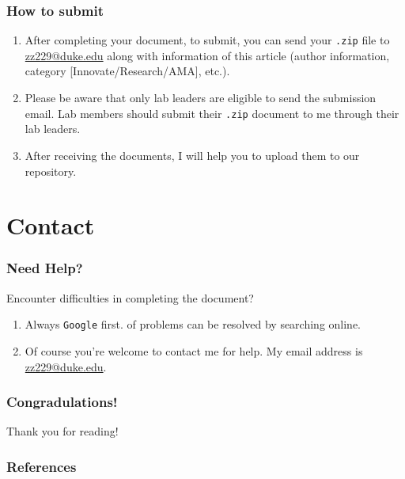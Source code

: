 \documentclass{beamer}
\begin{document}
\begin{frame}
    \frametitle{How to submit}

    \begin{enumerate}
        \item  After completing your document, to submit, you can send your \texttt{.zip} file to \href{mailto:zz229@duke.edu}{zz229@duke.edu} along with information of this article (author information, category [Innovate/Research/AMA], etc.).
        \item Please be aware that only lab leaders are eligible to send the submission email. Lab members should submit their \texttt{.zip} document to me through their lab leaders.
        \item After receiving the documents, I will help you to upload them to our repository.
    \end{enumerate}
\end{frame}

\section{Contact}
\begin{frame}
    \frametitle{Need Help?}

    Encounter difficulties in completing the document?

    \begin{enumerate}
        \item Always \texttt{Google} first.  of problems can be resolved by searching online.
        \item Of course you're welcome to contact me for help. My email address is \href{mailto:zz229@duke.edu}{zz229@duke.edu}.
    \end{enumerate}
\end{frame}

\begin{frame}
    \frametitle{Congradulations!} 

    {
        \huge
        Thank you for reading!
    }

\end{frame}

\begin{frame}[fragile]
	\frametitle{References}
	\printbibliography
\end{frame}
\end{document}
